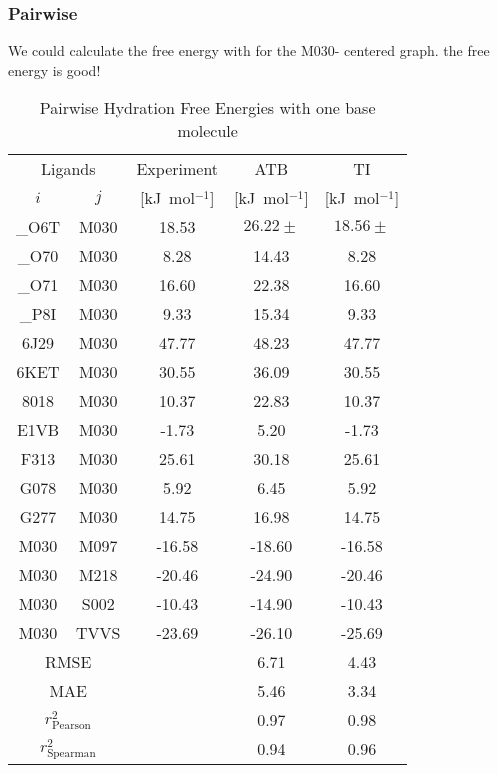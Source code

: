 
\subsubsection{Pairwise}
We could calculate the free energy with for the M030- centered graph.
the free energy is good!

\begin{table}[H]
\caption{Pairwise Hydration Free Energies with one base molecule}
\begin{center}
\footnotesize
\begin{tabular}{ c c |c |c|c|}
  \multicolumn{2}{c|}{Ligands} & \multicolumn{1}{c|}{Experiment\cite{Huang2012}} &\multicolumn{1}{c|}{ATB}&\multicolumn{1}{c|}{TI}\\ 
    $i$ & $j$ & [kJ~mol$^{-1}$] & [kJ~mol$^{-1}$] & [kJ~mol$^{-1}$]  \\
  \hline
        \_O6T &  M030 &  18.53  & $26.22 \pm $  &  $18.56 \pm $\\
        \_O70 &  M030 &   8.28  &  14.43  &   8.28\\
        \_O71 &  M030 &  16.60  &  22.38  &  16.60\\
        \_P8I &  M030 &   9.33  &  15.34  &   9.33\\
        6J29 &  M030 &   47.77  &  48.23  &  47.77\\
        6KET &  M030 &   30.55  &  36.09  &  30.55\\
        8018 &  M030 &   10.37  &  22.83  &  10.37\\
        E1VB &  M030 &   -1.73  &   5.20  &  -1.73\\
        F313 &  M030 &   25.61  &  30.18  &  25.61\\
        G078 &  M030 &    5.92  &   6.45  &   5.92\\
        G277 &  M030 &   14.75  &  16.98  &  14.75\\
        M030 &  M097 &  -16.58  & -18.60  & -16.58\\
        M030 &  M218 &  -20.46  & -24.90  & -20.46\\
        M030 &  S002 &  -10.43  & -14.90  & -10.43\\
        M030 &  TVVS &  -23.69  & -26.10  & -25.69\\
  \hline
        \multicolumn{2}{c|}{RMSE} &          & 6.71      & 4.43\\
        \multicolumn{2}{c|}{MAE} &           & 5.46      & 3.34 \\
        \multicolumn{2}{c|}{$r^2_{\text{Pearson}}$} & & 0.97  & 0.98 \\
        \multicolumn{2}{c|}{$r^2_{\text{Spearman}}$} &  & 0.94 & 0.96  \\
\end{tabular}
\end{center}
\label{SItab: RE-EDS_FE_RingCycleOpening_ddF}
\end{table}


